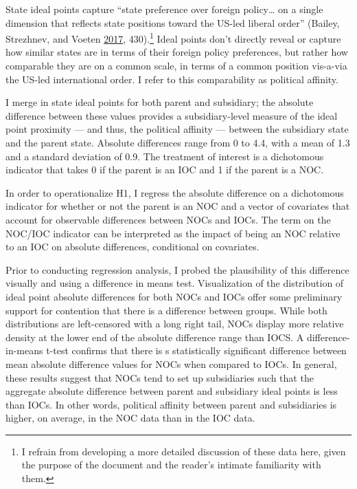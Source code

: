 \documentclass[11pt,]{book}
\begin{document}
State ideal points capture ``state preference over foreign policy\ldots{} on a single dimension that reflects state positions toward the US-led liberal order'' (Bailey, Strezhnev, and Voeten \protect\hyperlink{ref-bailey_estimating_2017}{2017}, 430).\footnote{I refrain from developing a more detailed discussion of these data here, given the purpose of the document and the reader's intimate familiarity with them.} Ideal points don't directly reveal or capture how similar states are in terms of their foreign policy preferences, but rather how comparable they are on a common scale, in terms of a common position vis-a-via the US-led international order. I refer to this comparability as political affinity.

I merge in state ideal points for both parent and subsidiary; the absolute difference between these values provides a subsidiary-level measure of the ideal point proximity --- and thus, the political affinity --- between the subsidiary state and the parent state. Absolute differences range from 0 to 4.4, with a mean of 1.3 and a standard deviation of 0.9. The treatment of interest is a dichotomous indicator that takes 0 if the parent is an IOC and 1 if the parent is a NOC.

In order to operationalize H1, I regress the absolute difference on a dichotomous indicator for whether or not the parent is an NOC and a vector of covariates that account for observable differences between NOCs and IOCs. The term on the NOC/IOC indicator can be interpreted as the impact of being an NOC relative to an IOC on absolute differences, conditional on covariates.

Prior to conducting regression analysis, I probed the plausibility of this difference visually and using a difference in means test. Visualization of the distribution of ideal point absolute differences for both NOCs and IOCs offer some preliminary support for contention that there is a difference between groups. While both distributions are left-censored with a long right tail, NOCs display more relative density at the lower end of the absolute difference range than IOCS. A difference-in-means t-test confirms that there is s statistically significant difference between mean absolute difference values for NOCs when compared to IOCs. In general, these results suggest that NOCs tend to set up subsidiaries such that the aggregate absolute difference between parent and subsidiary ideal points is less than IOCs. In other words, political affinity between parent and subsidiaries is higher, on average, in the NOC data than in the IOC data.
\end{document}
